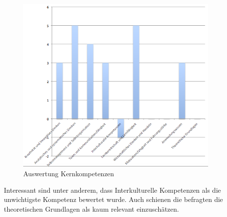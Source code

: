 \begin{figure}[ht]
	\centering
	\includegraphics[width=0.9\textwidth]{images/Auswertung_kernkompetenzen.png}
	\caption{Auswertung Kernkompetenzen}
	\label{fig:auswerkomp}
\end{figure}


Interessant sind unter anderem, dass Interkulturelle Kompetenzen als die unwichtigste Kompetenz bewertet wurde. Auch schienen die befragten die theoretischen Grundlagen als kaum relevant einzuschätzen.

